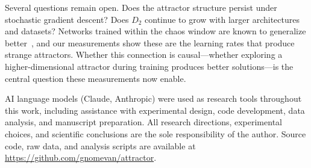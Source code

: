 \documentclass[aps,prl,twocolumn,superscriptaddress,floatfix]{revtex4-2}
\begin{document}
Several questions remain open. Does the attractor structure persist under stochastic gradient descent? Does $D_2$ continue to grow with larger architectures and datasets? Networks trained within the chaos window are known to generalize better~\cite{cohen2021}, and our measurements show these are the learning rates that produce strange attractors. Whether this connection is causal---whether exploring a higher-dimensional attractor during training produces better solutions---is the central question these measurements now enable.

\begin{acknowledgments}
AI language models (Claude, Anthropic) were used as research tools throughout this work, including assistance with experimental design, code development, data analysis, and manuscript preparation. All research directions, experimental choices, and scientific conclusions are the sole responsibility of the author. Source code, raw data, and analysis scripts are available at \url{https://github.com/gnomevan/attractor}.
\end{acknowledgments}


\end{document}
